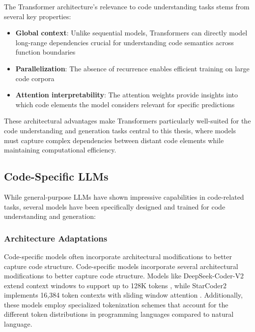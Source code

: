 \documentclass[%
thesis=student,%
coverpage=false,%
titlepage=false,%
headmarks=true, %
english,%
font=libertine, %
math=newpxtx, %
BCOR=5mm,%
coverBCOR=11mm%
]{tum-templates/book/tumbook}
\begin{document}
The Transformer architecture's relevance to code understanding tasks stems from several key properties:
\begin{itemize}
    \item \textbf{Global context}: Unlike sequential models, Transformers can directly model long-range dependencies crucial for understanding code semantics across function boundaries
    \item \textbf{Parallelization}: The absence of recurrence enables efficient training on large code corpora
    \item \textbf{Attention interpretability}: The attention weights provide insights into which code elements the model considers relevant for specific predictions
\end{itemize}

These architectural advantages make Transformers particularly well-suited for the code understanding and generation tasks central to this thesis, where models must capture complex dependencies between distant code elements while maintaining computational efficiency. 

\subsection{Code-Specific LLMs}

While general-purpose LLMs have shown impressive capabilities in code-related tasks, several models have been specifically designed and trained for code understanding and generation:

\subsubsection{Architecture Adaptations}
Code-specific models often incorporate architectural modifications to better capture code structure. Code-specific models incorporate several architectural modifications to better capture code structure. Models like DeepSeek-Coder-V2 extend context windows to support up to 128K tokens \cite{Zhu2024}, while StarCoder2 implements 16,384 token contexts with sliding window attention \cite{Lozhkov2024}. Additionally, these models employ specialized tokenization schemes that account for the different token distributions in programming languages compared to natural language.
\end{document}
